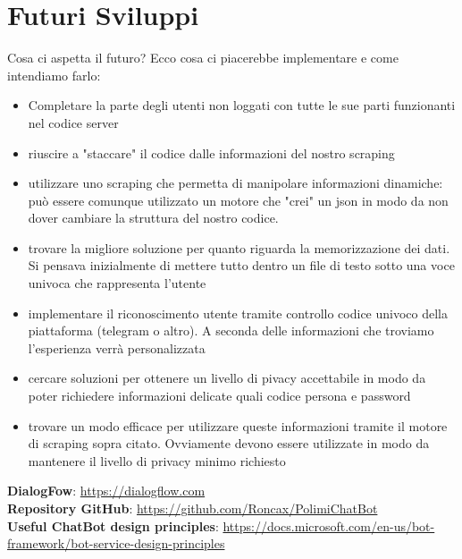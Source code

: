 \documentclass[]{article}
\begin{document}
\section{Futuri Sviluppi}
Cosa ci aspetta il futuro? Ecco cosa ci piacerebbe implementare e come intendiamo farlo:
\begin{itemize}
\item Completare la parte degli utenti non loggati con tutte le sue parti funzionanti nel codice server
\item riuscire a "staccare" il codice dalle informazioni del nostro scraping 
\item utilizzare uno scraping che permetta di manipolare informazioni dinamiche: può essere comunque utilizzato un motore che "crei" un json in modo da non dover cambiare la struttura del nostro codice.
\item trovare la migliore soluzione per quanto riguarda la memorizzazione dei dati. Si pensava inizialmente di mettere tutto dentro un file di testo sotto una voce univoca che rappresenta l'utente 
\item implementare il riconoscimento utente tramite controllo codice univoco della piattaforma (telegram o altro). A seconda delle informazioni che troviamo l'esperienza verrà personalizzata
\item cercare soluzioni per ottenere un livello di pivacy accettabile in modo da poter richiedere informazioni delicate quali codice persona e password
\item trovare un modo efficace per utilizzare queste informazioni tramite il motore di scraping sopra citato. Ovviamente devono essere utilizzate in modo da mantenere il livello di privacy minimo richiesto
\end{itemize}

\begin{thebibliography}{9}
\textbf{DialogFow}: \url{https://dialogflow.com} \\
\textbf{Repository GitHub}: \url{https://github.com/Roncax/PolimiChatBot} \\
\textbf{Useful ChatBot design principles}: \url{https://docs.microsoft.com/en-us/bot-framework/bot-service-design-principles} \\
\end{thebibliography}
\end{document}
